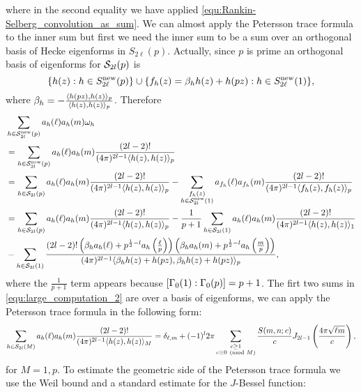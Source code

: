 \documentclass[12pt,reqno,oneside]{amsart}
\begin{document}
    where in the second equality we have applied \cref{equ:Rankin-Selberg_convolution_as_sum}. We can almost apply the Petersson trace formula to the inner sum but first we need the inner sum to be a sum over an orthogonal basis of Hecke eigenforms in $S_{2\ell}(p)$. Actually, since $p$ is prime an orthogonal basis of eigenforms for $\mathcal{S}_{2l}(p)$ is
    \[
        \{h(z):h \in S_{2\ell}^{\text{new}}(p)\} \cup \{f_{h}(z) = \beta_{h}h(z)+h(pz):h \in S_{2\ell}^{\text{new}}(1)\},
    \]
    where $\beta_{h} = -\frac{\langle h(pz),h(z)\rangle_{p}}{\langle h(z),h(z)\rangle_{p}}$. Therefore
    \begin{equation}\label{equ:large_computation_2}
        \begin{aligned}
            &\sum_{h \in \mathcal{S}_{2l}^{\text{new}}(p)}a_{h}(\ell)a_{h}(m)\omega_{h} \\
            &= \sum_{h \in \mathcal{S}_{2l}^{\text{new}}(p)}a_{h}(\ell)a_{h}(m)\frac{(2l-2)!}{(4\pi)^{2l-1}\langle h(z),h(z)\rangle_{p}} \\
            &= \sum_{h \in \mathcal{S}_{2l}(p)}a_{h}(\ell)a_{h}(m)\frac{(2l-2)!}{(4\pi)^{2l-1}\langle h(z),h(z)\rangle_{p}}-\sum_{\substack{f_{h}(z) \\ h \in \mathcal{S}_{2l}^{\text{new}}(1)}}a_{f_{h}}(\ell)a_{f_{h}}(m)\frac{(2l-2)!}{(4\pi)^{2l-1}\langle f_{h}(z),f_{h}(z)\rangle_{p}} \\
            &= \sum_{h \in \mathcal{S}_{2l}(p)}a_{h}(\ell)a_{h}(m)\frac{(2l-2)!}{(4\pi)^{2l-1}\langle h(z),h(z)\rangle_{p}}-\frac{1}{p+1}\sum_{h \in \mathcal{S}_{2l}(1)}a_{h}(\ell)a_{h}(m)\frac{(2l-2)!}{(4\pi)^{2l-1}\langle h(z),h(z)\rangle_{1}} \\
            &-\sum_{h \in \mathcal{S}_{2l}(1)}\frac{(2l-2)!\left(\beta_{h}a_{h}(\ell)+p^{\frac{1}{2}-l}a_{h}\left(\frac{\ell}{p}\right)\right)\left(\beta_{h}a_{h}(m)+p^{\frac{1}{2}-l}a_{h}\left(\frac{m}{p}\right)\right)}{(4\pi)^{2l-1}\langle\beta_{h}h(z)+h(pz),\beta_{h}h(z)+h(pz)\rangle_{p}},
        \end{aligned}
    \end{equation}
    where the $\frac{1}{p+1}$ term appears because $[\Gamma_{0}(1):\Gamma_{0}(p)] = p+1$. The firt two sums in \cref{equ:large_computation_2} are over a basis of eigenforms, we can apply the Petersson trace formula in the following form:
    \[
        \sum_{h \in \mathcal{S}_{2l}(M)}a_{h}(\ell)a_{h}(m)\frac{(2l-2)!}{(4\pi)^{2l-1}\langle h(z),h(z)\rangle_{M}} = \delta_{\ell,m}+(-1)^{l}2\pi\sum_{\substack{c \ge 1 \\ c \equiv 0 \ \left(\text{mod }M\right)}}\frac{S(m,n;c)}{c}J_{2l-1}\left(\frac{4\pi\sqrt{\ell m}}{c}\right),
    \]
    for $M = 1,p$. To estimate the geometric side of the Petersson trace formula we use the Weil bound and a standard estimate for the $J$-Bessel function:
\end{document}
